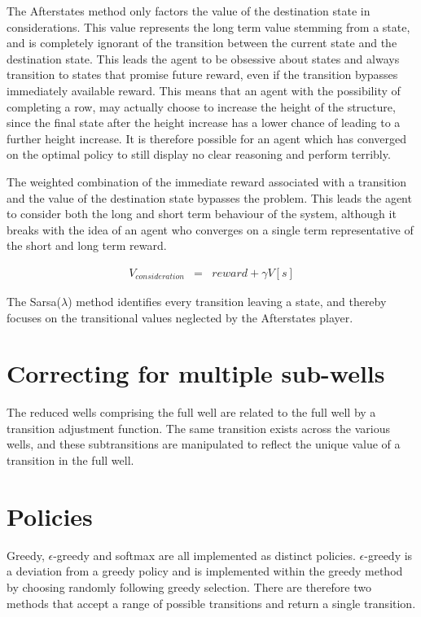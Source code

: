 \documentclass{rucsthesis}
\begin{document}
The Afterstates method only factors the value of the destination state in considerations. This value represents the long term value stemming from a state, and is completely ignorant of the transition between the current state and the destination state. This leads the agent to be obsessive about states and always transition to states that promise future reward, even if the transition bypasses immediately available reward. This means that an agent with the possibility of completing a row, may actually choose to increase the height of the structure, since the final state after the height increase has a lower chance of leading to a further height increase. It is therefore possible for an agent which has converged on the optimal policy to still display no clear reasoning and perform terribly. 

The weighted combination of the immediate reward associated with a transition and the value of the destination state bypasses the problem. This leads the agent to consider both the long and short term behaviour of the system, although it breaks with the idea of an agent who converges on a single term representative of the short and long term reward.

\begin{eqnarray*}
V_{consideration} & = & reward + \gamma V[s]
\end{eqnarray*} 
 
The Sarsa($\lambda$) method identifies every transition leaving a state, and thereby focuses on the transitional values neglected by the Afterstates player.

\section{Correcting for multiple sub-wells}

The reduced wells comprising the full well are related to the full well by a transition adjustment function. The same transition exists across the various wells, and these subtransitions are manipulated to reflect the unique value of a transition in the full well. 

\section{Policies}

Greedy, $\epsilon$-greedy and softmax are all implemented as distinct policies. $\epsilon$-greedy is a deviation from a greedy policy and is implemented within the greedy method by choosing randomly following greedy selection. There are therefore two methods that accept a range of possible transitions and return a single transition.
\end{document}
